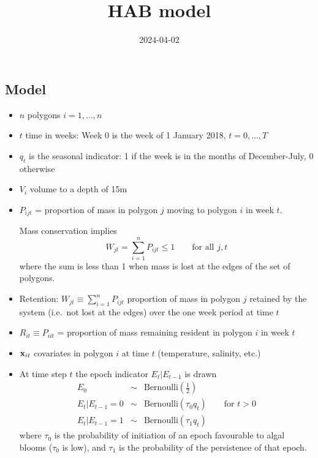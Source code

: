\documentclass[
]{article}
\title{HAB model}
\author{}
\date{\vspace{-2.5em}2024-04-02}
\begin{document}
\maketitle

\hypertarget{model}{%
\subsection{Model}\label{model}}

\begin{itemize}
\item
  \(n\) polygons \(i=1,\ldots,n\)
\item
  \(t\) time in weeks: Week 0 is the week of 1 January 2018,
  \(t=0,\ldots,T\)
\item
  \(q_t\) is the seasonal indicator: 1 if the week is in the months of
  December-July, 0 otherwise
\item
  \(V_i\) volume to a depth of 15m
\item
  \(P_{ijt}\) = proportion of mass in polygon \(j\) moving to polygon
  \(i\) in week \(t\).

  Mass conservation implies \[ 
    W_{jt} = \sum_{i=1}^n P_{ijt}\leq 1 \qquad\text{for all $j,t$}
  \] where the sum is less than 1 when mass is lost at the edges of the
  set of polygons.
\item
  Retention: \(W_{jt} \equiv \sum_{i=1}^n P_{ijt}\) proportion of mass
  in polygon \(j\) retained by the system (i.e.~not lost at the edges)
  over the one week period at time \(t\)
\item
  \(R_{it} \equiv P_{iit}\) = proportion of mass remaining resident in
  polygon \(i\) in week \(t\)
\item
  \({\bf x}_{it}\) covariates in polygon \(i\) at time \(t\)
  (temperature, salinity, etc.)
\item
  At time step \(t\) the epoch indicator \(E_t|E_{t-1}\) is drawn
  \begin{eqnarray*}
     E_0           &\sim& \text{Bernoulli}(\mbox{$\frac12$})\\
     E_t|E_{t-1}=0 &\sim& \text{Bernoulli}(\tau_0 q_t)\qquad\text{for $t>0$}\\
     E_t|E_{t-1}=1 &\sim& \text{Bernoulli}(\tau_1 q_t)
  \end{eqnarray*} where \(\tau_0\) is the probability of initiation of
  an epoch favourable to algal blooms (\(\tau_0\) is low), and
  \(\tau_1\) is the probability of the persistence of that epoch.


\end{itemize}
\end{document}
